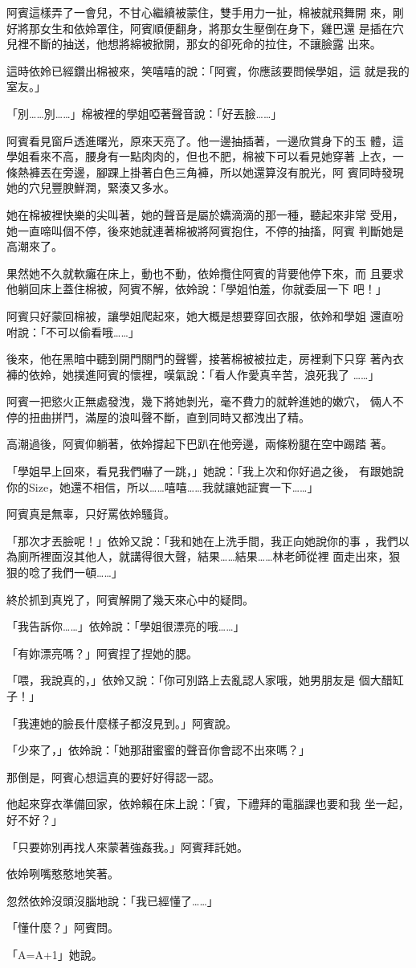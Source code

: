 阿賓這樣弄了一會兒，不甘心繼續被蒙住，雙手用力一扯，棉被就飛舞開
來，剛好將那女生和依姈罩住，阿賓順便翻身，將那女生壓倒在身下，雞巴還
是插在穴兒裡不斷的抽送，他想將綿被掀開，那女的卻死命的拉住，不讓臉露
出來。

這時依姈已經鑽出棉被來，笑嘻嘻的說：「阿賓，你應該要問候學姐，這
就是我的室友。」

「別……別……」棉被裡的學姐啞著聲音說：「好丟臉……」

阿賓看見窗戶透進曙光，原來天亮了。他一邊抽插著，一邊欣賞身下的玉
體，這學姐看來不高，腰身有一點肉肉的，但也不肥，棉被下可以看見她穿著
上衣，一條熱褲丟在旁邊，腳踝上掛著白色三角褲，所以她還算沒有脫光，阿
賓同時發現她的穴兒豐腴鮮潤，緊湊又多水。

她在棉被裡快樂的尖叫著，她的聲音是屬於嬌滴滴的那一種，聽起來非常
受用，她一直啼叫個不停，後來她就連著棉被將阿賓抱住，不停的抽搐，阿賓
判斷她是高潮來了。

果然她不久就軟癱在床上，動也不動，依姈攬住阿賓的背要他停下來，而
且要求他躺回床上蓋住棉被，阿賓不解，依姈說：「學姐怕羞，你就委屈一下
吧！」

阿賓只好蒙回棉被，讓學姐爬起來，她大概是想要穿回衣服，依姈和學姐
還直吩咐說：「不可以偷看哦……」

後來，他在黑暗中聽到開門關門的聲響，接著棉被被拉走，房裡剩下只穿
著內衣褲的依姈，她撲進阿賓的懷裡，嘆氣說：「看人作愛真辛苦，浪死我了
……」

阿賓一把慾火正無處發洩，幾下將她剝光，毫不費力的就幹進她的嫩穴，
倆人不停的扭曲拼鬥，滿屋的浪叫聲不斷，直到同時又都洩出了精。

高潮過後，阿賓仰躺著，依姈撐起下巴趴在他旁邊，兩條粉腿在空中踢踏
著。

「學姐早上回來，看見我們嚇了一跳，」她說：「我上次和你好過之後，
有跟她說你的Size，她還不相信，所以……嘻嘻……我就讓她証實一下……」

阿賓真是無辜，只好罵依姈騷貨。

「那次才丟臉呢！」依姈又說：「我和她在上洗手間，我正向她說你的事
，我們以為廁所裡面沒其他人，就講得很大聲，結果……結果……林老師從裡
面走出來，狠狠的唸了我們一頓……」

終於抓到真兇了，阿賓解開了幾天來心中的疑問。

「我告訴你……」依姈說：「學姐很漂亮的哦……」

「有妳漂亮嗎？」阿賓捏了捏她的腮。

「喂，我說真的，」依姈又說：「你可別路上去亂認人家哦，她男朋友是
個大醋缸子！」

「我連她的臉長什麼樣子都沒見到。」阿賓說。

「少來了，」依姈說：「她那甜蜜蜜的聲音你會認不出來嗎？」

那倒是，阿賓心想這真的要好好得認一認。

他起來穿衣準備回家，依姈賴在床上說：「賓，下禮拜的電腦課也要和我
坐一起，好不好？」

「只要妳別再找人來蒙著強姦我。」阿賓拜託她。

依姈咧嘴憨憨地笑著。

忽然依姈沒頭沒腦地說：「我已經懂了……」

「懂什麼？」阿賓問。

「A=A+1」她說。










